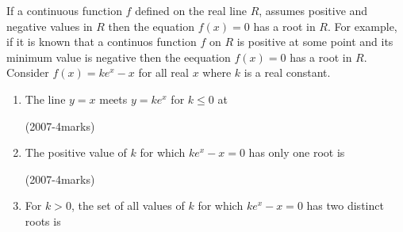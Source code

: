 \documentclass[journal,,12pt,twocolumn]{IEEEtran}
\theoremstyle{remark}
\begin{document}
 If a continuous function $f$ defined on the real line $R$, assumes positive and negative values in $R$ then the equation $f(x)=0$ has a root in $R$. For example, if it is known that a continuos function $f$ on $R$ is positive at some point and its minimum value is negative then the eequation $f(x)=0$ has a root in $R$.\\
 Consider $f(x)=ke^x-x$ for all real $x$ where $k$ is a real constant.
 \begin{enumerate}
 \item The line $y=x$ meets $y=ke^x$ for $k \le 0$ at
    \begin{enumerate}
\end{enumerate}

  
\hfill {(2007-4marks)}\\


\item  The positive value of $k$ for which $ke^x-x=0$ has only one root is
\begin{enumerate}
\end{enumerate}

\hfill {(2007-4marks)}


\item For $k>0$, the set of all values of $k$ for which $ke^x-x=0$ has two distinct roots is 
\begin{enumerate}
\end{enumerate}


\end{enumerate}
\end{document}
